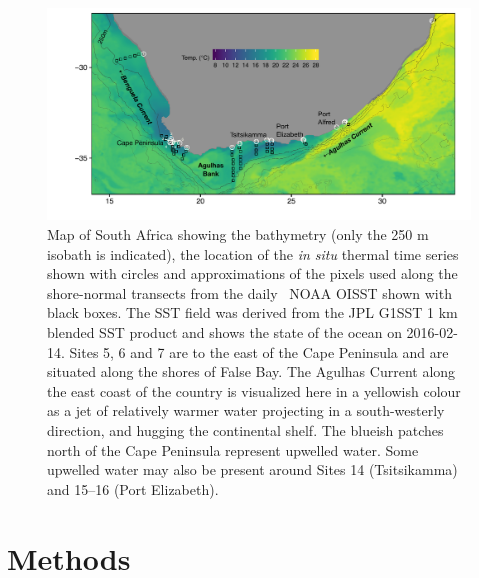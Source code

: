 \documentclass[a4paper,10pt,review]{elsarticle}
\begin{document}
\begin{figure}
\includegraphics[width=1.0\textwidth]{figure1_1km_labeled.pdf}
\caption{Map of South Africa showing the bathymetry (only the 250 m isobath is indicated), the location of the \emph{in situ} thermal time series shown with circles and approximations of the pixels used along the shore-normal transects from the daily \degree~NOAA OISST \cite{Reynolds2007} shown with black boxes. The SST field was derived from the JPL G1SST 1 km blended SST product and shows the state of the ocean on 2016-02-14. Sites 5, 6 and 7 are to the east of the Cape Peninsula and are situated along the shores of False Bay. The Agulhas Current along the east coast of the country is visualized here in a yellowish colour as a jet of relatively warmer water projecting in a south-westerly direction, and hugging the continental shelf. The blueish patches north of the Cape Peninsula represent upwelled water. Some upwelled water may also be present around Sites 14 (Tsitsikamma) and 15--16 (Port Elizabeth).} \label{fig:Figure1}
\end{figure}

\section{Methods}
\end{document}

